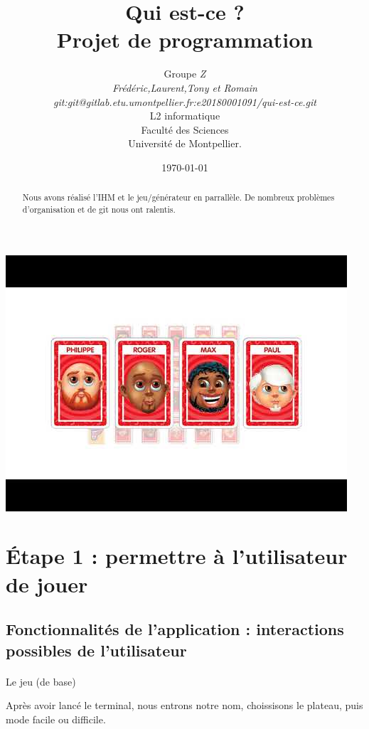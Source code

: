 \documentclass[a4paper]{article}
\title{  Qui est-ce ?\\         %
  Projet de programmation}
\author{Groupe \emph{Z}\\
  \emph{Frédéric,Laurent,Tony et Romain}\\
  \emph{git:git@gitlab.etu.umontpellier.fr:e20180001091/qui-est-ce.git}\\
  L2 informatique\\
  Faculté des Sciences\\
Université de Montpellier.}
\date{\today}
\begin{document}
\maketitle                    %

\begin{center}               %
  \includegraphics[scale=1]{img.jpg}   %
\end{center}

\begin{abstract}     %
Nous avons réalisé l'IHM et le jeu/générateur en parrallèle. De nombreux problèmes d'organisation et de git nous ont ralentis.
\end{abstract}

\section{Étape 1 : permettre à l'utilisateur de jouer}

\subsection*{Fonctionnalités de l'application : interactions possibles de l'utilisateur}

\paragraph*{}
Le jeu (de base)

Après avoir lancé le terminal, nous entrons notre nom, choissisons le plateau, puis mode facile ou difficile.
\end{document}
